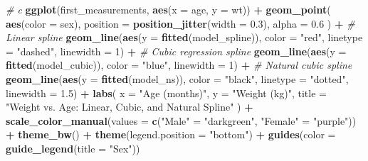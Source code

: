 \documentclass[
]{article}
\newenvironment{Shaded}{\begin{snugshade}}{\end{snugshade}}
\newcommand{\AttributeTok}[1]{\textcolor[rgb]{0.13,0.29,0.53}{#1}}
\newcommand{\CommentTok}[1]{\textcolor[rgb]{0.56,0.35,0.01}{\textit{#1}}}
\newcommand{\DecValTok}[1]{\textcolor[rgb]{0.00,0.00,0.81}{#1}}
\newcommand{\FloatTok}[1]{\textcolor[rgb]{0.00,0.00,0.81}{#1}}
\newcommand{\FunctionTok}[1]{\textcolor[rgb]{0.13,0.29,0.53}{\textbf{#1}}}
\newcommand{\NormalTok}[1]{#1}
\newcommand{\OtherTok}[1]{\textcolor[rgb]{0.56,0.35,0.01}{#1}}
\newcommand{\SpecialCharTok}[1]{\textcolor[rgb]{0.81,0.36,0.00}{\textbf{#1}}}
\newcommand{\StringTok}[1]{\textcolor[rgb]{0.31,0.60,0.02}{#1}}
\begin{document}
\begin{Shaded}
\begin{Highlighting}[]
\CommentTok{\# c}
\FunctionTok{ggplot}\NormalTok{(first\_measurements, }\FunctionTok{aes}\NormalTok{(}\AttributeTok{x =}\NormalTok{ age, }\AttributeTok{y =}\NormalTok{ wt)) }\SpecialCharTok{+}
  \FunctionTok{geom\_point}\NormalTok{(}
    \FunctionTok{aes}\NormalTok{(}\AttributeTok{color =}\NormalTok{ sex),}
    \AttributeTok{position =} \FunctionTok{position\_jitter}\NormalTok{(}\AttributeTok{width =} \FloatTok{0.3}\NormalTok{),}
    \AttributeTok{alpha =} \FloatTok{0.6}
\NormalTok{  ) }\SpecialCharTok{+}
  \CommentTok{\# Linear spline }
  \FunctionTok{geom\_line}\NormalTok{(}\FunctionTok{aes}\NormalTok{(}\AttributeTok{y =} \FunctionTok{fitted}\NormalTok{(model\_spline)), }\AttributeTok{color =} \StringTok{"red"}\NormalTok{, }\AttributeTok{linetype =} \StringTok{"dashed"}\NormalTok{, }\AttributeTok{linewidth =} \DecValTok{1}\NormalTok{) }\SpecialCharTok{+}
  \CommentTok{\# Cubic regression spline }
  \FunctionTok{geom\_line}\NormalTok{(}\FunctionTok{aes}\NormalTok{(}\AttributeTok{y =} \FunctionTok{fitted}\NormalTok{(model\_cubic)), }\AttributeTok{color =} \StringTok{"blue"}\NormalTok{, }\AttributeTok{linewidth =} \DecValTok{1}\NormalTok{) }\SpecialCharTok{+}
  \CommentTok{\# Natural cubic spline}
  \FunctionTok{geom\_line}\NormalTok{(}\FunctionTok{aes}\NormalTok{(}\AttributeTok{y =} \FunctionTok{fitted}\NormalTok{(model\_ns)), }\AttributeTok{color =} \StringTok{"black"}\NormalTok{, }\AttributeTok{linetype =} \StringTok{"dotted"}\NormalTok{, }\AttributeTok{linewidth =} \FloatTok{1.5}\NormalTok{) }\SpecialCharTok{+}
  \FunctionTok{labs}\NormalTok{(}
    \AttributeTok{x =} \StringTok{"Age (months)"}\NormalTok{,}
    \AttributeTok{y =} \StringTok{"Weight (kg)"}\NormalTok{,}
    \AttributeTok{title =} \StringTok{"Weight vs. Age: Linear, Cubic, and Natural Spline"}
\NormalTok{  ) }\SpecialCharTok{+}
  \FunctionTok{scale\_color\_manual}\NormalTok{(}\AttributeTok{values =} \FunctionTok{c}\NormalTok{(}\StringTok{"Male"} \OtherTok{=} \StringTok{"darkgreen"}\NormalTok{, }\StringTok{"Female"} \OtherTok{=} \StringTok{"purple"}\NormalTok{)) }\SpecialCharTok{+}
  \FunctionTok{theme\_bw}\NormalTok{() }\SpecialCharTok{+}
  \FunctionTok{theme}\NormalTok{(}\AttributeTok{legend.position =} \StringTok{"bottom"}\NormalTok{) }\SpecialCharTok{+}
  \FunctionTok{guides}\NormalTok{(}\AttributeTok{color =} \FunctionTok{guide\_legend}\NormalTok{(}\AttributeTok{title =} \StringTok{"Sex"}\NormalTok{))}
\end{Highlighting}
\end{Shaded}
\end{document}
